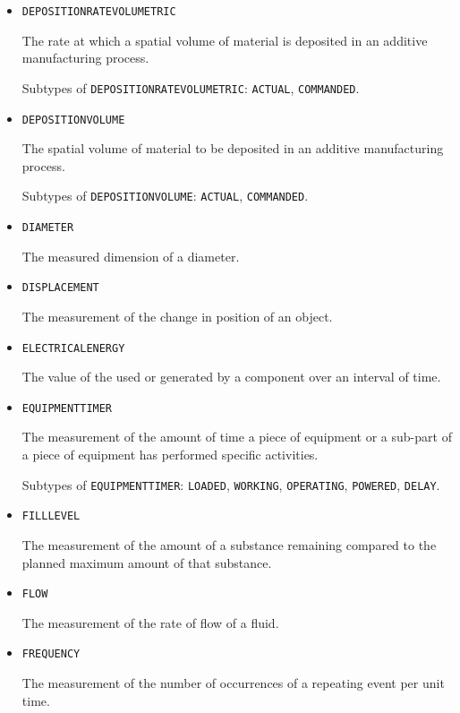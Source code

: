 \begin{itemize}
\item \texttt{DEPOSITION\textunderscore RATE\textunderscore VOLUMETRIC}  

The rate at which a spatial volume of material is deposited in an additive manufacturing process.

Subtypes of \texttt{DEPOSITION\textunderscore RATE\textunderscore VOLUMETRIC}: \texttt{ACTUAL}, \texttt{COMMANDED}.

\item \texttt{DEPOSITION\textunderscore VOLUME}  

The spatial volume of material to be deposited in an additive manufacturing process.

Subtypes of \texttt{DEPOSITION\textunderscore VOLUME}: \texttt{ACTUAL}, \texttt{COMMANDED}.

\item \texttt{DIAMETER}  

The measured dimension of a diameter.


\item \texttt{DISPLACEMENT}  

The measurement of the change in position of an object.


\item \texttt{ELECTRICAL\textunderscore ENERGY}  

The value of the  used or generated by a component over an interval of time.


\item \texttt{EQUIPMENT\textunderscore TIMER}  

The measurement of the amount of time a piece of equipment or a sub-part of a piece of equipment has performed specific activities.

Subtypes of \texttt{EQUIPMENT\textunderscore TIMER}: \texttt{LOADED}, \texttt{WORKING}, \texttt{OPERATING}, \texttt{POWERED}, \texttt{DELAY}.

\item \texttt{FILL\textunderscore LEVEL}  

The measurement of the amount of a substance remaining compared to the planned maximum amount of that substance.


\item \texttt{FLOW}  

The measurement of the rate of flow of a fluid.


\item \texttt{FREQUENCY}  

The measurement of the number of occurrences of a repeating event per unit time.



\end{itemize}
